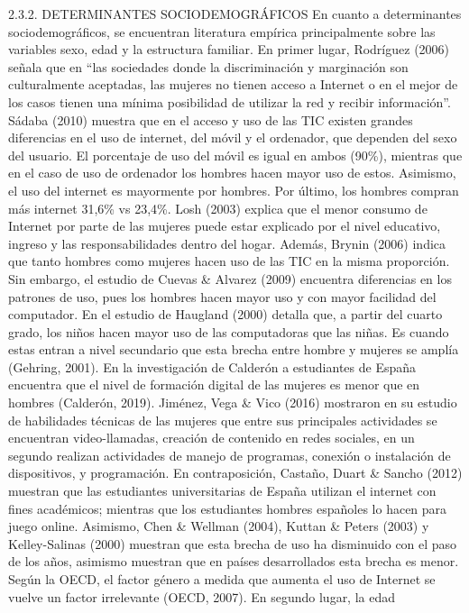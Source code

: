 2.3.2. DETERMINANTES SOCIODEMOGRÁFICOS En cuanto a determinantes
sociodemográficos, se encuentran literatura empírica principalmente
sobre las variables sexo, edad y la estructura familiar. En primer
lugar, Rodríguez (2006) señala que en ``las sociedades donde la
discriminación y marginación son culturalmente aceptadas, las mujeres no
tienen acceso a Internet o en el mejor de los casos tienen una mínima
posibilidad de utilizar la red y recibir información''. Sádaba (2010)
muestra que en el acceso y uso de las TIC existen grandes diferencias en
el uso de internet, del móvil y el ordenador, que dependen del sexo del
usuario. El porcentaje de uso del móvil es igual en ambos (90\%),
mientras que en el caso de uso de ordenador los hombres hacen mayor uso
de estos. Asimismo, el uso del internet es mayormente por hombres. Por
último, los hombres compran más internet 31,6\% vs 23,4\%. Losh (2003)
explica que el menor consumo de Internet por parte de las mujeres puede
estar explicado por el nivel educativo, ingreso y las responsabilidades
dentro del hogar. Además, Brynin (2006) indica que tanto hombres como
mujeres hacen uso de las TIC en la misma proporción. Sin embargo, el
estudio de Cuevas \& Alvarez (2009) encuentra diferencias en los
patrones de uso, pues los hombres hacen mayor uso y con mayor facilidad
del computador. En el estudio de Haugland (2000) detalla que, a partir
del cuarto grado, los niños hacen mayor uso de las computadoras que las
niñas. Es cuando estas entran a nivel secundario que esta brecha entre
hombre y mujeres se amplía (Gehring, 2001). En la investigación de
Calderón a estudiantes de España encuentra que el nivel de formación
digital de las mujeres es menor que en hombres (Calderón, 2019).
Jiménez, Vega \& Vico (2016) mostraron en su estudio de habilidades
técnicas de las mujeres que entre sus principales actividades se
encuentran video-llamadas, creación de contenido en redes sociales, en
un segundo realizan actividades de manejo de programas, conexión o
instalación de dispositivos, y programación. En contraposición, Castaño,
Duart \& Sancho (2012) muestran que las estudiantes universitarias de
España utilizan el internet con fines académicos; mientras que los
estudiantes hombres españoles lo hacen para juego online. Asimismo, Chen
\& Wellman (2004), Kuttan \& Peters (2003) y Kelley-Salinas (2000)
muestran que esta brecha de uso ha disminuido con el paso de los años,
asimismo muestran que en países desarrollados esta brecha es menor.
Según la OECD, el factor género a medida que aumenta el uso de Internet
se vuelve un factor irrelevante (OECD, 2007). En segundo lugar, la edad

